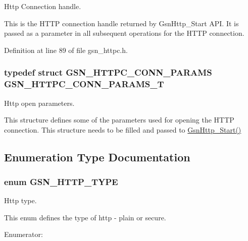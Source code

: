 Http Connection handle. 

This is the HTTP connection handle returned by GsnHttp\_\-Start API. It is passed as a parameter in all subsequent operations for the HTTP connection. 

Definition at line 89 of file gsn\_\-httpc.h.

\hypertarget{a00665_ga5e3ebb30a4f8cfd9e99f04e17839d148}{
\subsubsection[{GSN\_\-HTTPC\_\-CONN\_\-PARAMS\_\-T}]{\setlength{\rightskip}{0pt plus 5cm}typedef struct {\bf GSN\_\-HTTPC\_\-CONN\_\-PARAMS} {\bf GSN\_\-HTTPC\_\-CONN\_\-PARAMS\_\-T}}}
\label{a00665_ga5e3ebb30a4f8cfd9e99f04e17839d148}


Http open parameters. 

This structure defines some of the parameters used for opening the HTTP connection. This structure needs to be filled and passed to \hyperlink{a00665_gafac7279103004f23215fe92a28ed0331}{GsnHttp\_\-Start()} 

\subsection{Enumeration Type Documentation}
\hypertarget{a00665_ga918ab72c19100d330e6d4854b0ac0612}{
\subsubsection[{GSN\_\-HTTP\_\-TYPE}]{\setlength{\rightskip}{0pt plus 5cm}enum {\bf GSN\_\-HTTP\_\-TYPE}}}
\label{a00665_ga918ab72c19100d330e6d4854b0ac0612}


Http type. 

This enum defines the type of http -\/ plain or secure. \begin{Desc}
\item[Enumerator: ]\par
\begin{description}
\item[{\em 
\hypertarget{a00665_gga918ab72c19100d330e6d4854b0ac0612ad5a7b6c3a067d880ff872f888605566a}{
GSN\_\-HTTP}
\label{a00665_gga918ab72c19100d330e6d4854b0ac0612ad5a7b6c3a067d880ff872f888605566a}
}]\item[{\em 
\hypertarget{a00665_gga918ab72c19100d330e6d4854b0ac0612a6f80dcbc6ec710a3a2eee0b1708a4f31}{
GSN\_\-HTTPS}
\label{a00665_gga918ab72c19100d330e6d4854b0ac0612a6f80dcbc6ec710a3a2eee0b1708a4f31}
}]\end{description}
\end{Desc}



